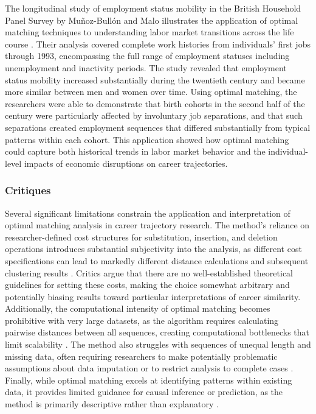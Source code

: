 \documentclass[../main.tex]{subfiles}
\begin{document}
The longitudinal study of employment status mobility in the British Household Panel Survey by Muñoz-Bullón and Malo illustrates the application of optimal matching techniques to understanding labor market transitions across the life course \citep{employment_status_mobility}. Their analysis covered complete work histories from individuals' first jobs through 1993, encompassing the full range of employment statuses including unemployment and inactivity periods. The study revealed that employment status mobility increased substantially during the twentieth century and became more similar between men and women over time. Using optimal matching, the researchers were able to demonstrate that birth cohorts in the second half of the century were particularly affected by involuntary job separations, and that such separations created employment sequences that differed substantially from typical patterns within each cohort. This application showed how optimal matching could capture both historical trends in labor market behavior and the individual-level impacts of economic disruptions on career trajectories.

\subsubsection{Critiques}

Several significant limitations constrain the application and interpretation of optimal matching analysis in career trajectory research. The method's reliance on researcher-defined cost structures for substitution, insertion, and deletion operations introduces substantial subjectivity into the analysis, as different cost specifications can lead to markedly different distance calculations and subsequent clustering results \citep{second_wave_sequence_analysis}. Critics argue that there are no well-established theoretical guidelines for setting these costs, making the choice somewhat arbitrary and potentially biasing results toward particular interpretations of career similarity. Additionally, the computational intensity of optimal matching becomes prohibitive with very large datasets, as the algorithm requires calculating pairwise distances between all sequences, creating computational bottlenecks that limit scalability \citep{sequence_analysis_social_science}. The method also struggles with sequences of unequal length and missing data, often requiring researchers to make potentially problematic assumptions about data imputation or to restrict analysis to complete cases \citep{sequence_analysis_social_science}. Finally, while optimal matching excels at identifying patterns within existing data, it provides limited guidance for causal inference or prediction, as the method is primarily descriptive rather than explanatory \citep{second_wave_sequence_analysis}.
\end{document}
